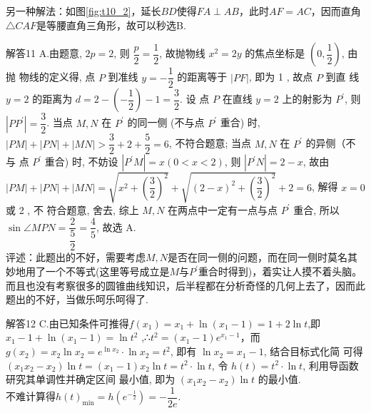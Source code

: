\documentclass[11pt]{article}
\begin{document}
\begin{compactdesc}
		\heiti 另一种解法：\songti 如图\ref{fig:t10_2}，延长$BD$使得$ FA\perp AB $，此时$ AF=AC $，因而直角$\triangle CAF$是等腰直角三角形，故可以秒选B.
	
	\item[解答11]	
		A.由题意, $2 p=2$, 则 $\dfrac{p}{2}=\dfrac{1}{2}$, 故抛物线 $x^{2}=2 y$ 的焦点坐标是 $\left(0, \dfrac{1}{2}\right)$, 由抛 物线的定义得, 点 $P$ 到准线 $y=-\dfrac{1}{2}$ 的距离等于 $|P F|$, 即为 1 , 故点 $P$ 到直 线 $y=2$ 的距离为 $d=2-\left(-\dfrac{1}{2}\right)-1=\dfrac{3}{2}$. 设 点 $P$ 在直线 $y=2$ 上的射影为 $P^{\prime}$, 则 $\left|P P^{\prime}\right|=\dfrac{3}{2}$. 当点 $M, N$ 在 $P^{\prime}$ 的同一侧 (不与点 $P^{\prime}$ 重合) 时, $|P M|+|P N|+|M N|>\dfrac{3}{2}+2+\dfrac{5}{2}=6$, 不符合题意; 当点 $M, N$ 在 $P^{\prime}$ 的异侧（不与 点 $P^{\prime}$ 重合) 时, 不妨设 $\left|P^{\prime} M\right|=x(0<x<2)$, 则 $\left|P^{\prime} N\right|=2-x$, 故由 $|P M|+|P N|+|M N|=\sqrt{x^{2}+\left(\dfrac{3}{2}\right)^{2}}+\sqrt{(2-x)^{2}+\left(\dfrac{3}{2}\right)^{2}}+2=6$, 解得 $x=0$ 或 2 , 不 符合题意, 舍去, 综上 $M, N$ 在两点中一定有一点与点 $P^{\prime}$ 重合, 所以 $\sin \angle M P N=\dfrac{2}{\dfrac{5}{2}}=\dfrac{4}{5}$, 故选 A.
		\\ \heiti 评述：\songti 此题出的不好，需要考虑$M,N$是否在同一侧的问题，而在同一侧时莫名其妙地用了一个不等式(这里等号成立是$M$与$P^{\prime}$重合时得到)，着实让人摸不着头脑。而且也没有考察很多的圆锥曲线知识，后半程都在分析奇怪的几何上去了，因而此题出的不好，当做乐呵乐呵得了.
		
	\item [解答12]
		C.由已知条件可推得$ f(x_1)=x_1+\ln (x_1-1)=1+2\ln t $,即$ x_1-1+\ln (x_1-1)=\ln t^2 $ ,∴$t^{2}=\left(x_{1}-1\right) e^{x_{1}-1}$，而$g(x_2)=x_2\ln x_2=e^{\ln x_{2}} \cdot \ln x_{2}=t^2$, 即有 $\ln x_{2}=x_{1}-1$, 结合目标式化简 可得 $\left(x_{1} x_{2}-x_{2}\right) \ln t=(x_1-1)x_2\ln t=t^{2} \cdot \ln t$, 令 $h(t)=t^{2} \cdot \ln t$, 利用导函数研究其单调性并确定区间 最小值, 即为 $\left(x_{1} x_{2}-x_{2}\right) \ln t$ 的最小值.
		\\不难计算得$h(t)_{\min}= h(e^{-\frac{1}{2} })=-\dfrac{1}{2e} $.		
\end{compactdesc}
\end{document}
